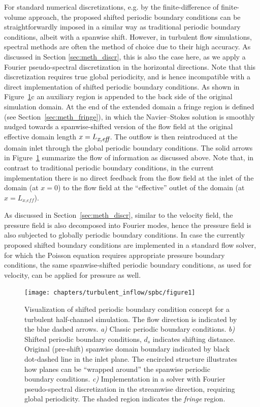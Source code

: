 	For standard numerical discretizations, e.g. by the finite-difference of finite-volume approach, the proposed shifted periodic boundary
	conditions can be straightforwardly imposed in a similar way as traditional periodic boundary conditions, albeit with a spanwise shift.
	However, in turbulent flow simulations,  spectral methods are often the method of choice due to their high accuracy. As discussed in Section
	\ref{sec:meth_discr}, this is also the case here, as we apply a Fourier pseudo-spectral discretization in the horizontal directions. Note that
	this discretization requires true global periodicity, and is hence incompatible with a direct implementation of shifted periodic boundary
	conditions. As shown in Figure~\ref{fig:concept}c an auxiliary region is appended to the back side of the original simulation domain. At the
	end of the extended domain a fringe region is defined (see Section~\ref{sec:meth_fringe}), in which the Navier--Stokes solution is smoothly
	nudged towards a spanwise-shifted version of the flow field at the original effective domain length $x = L_{\textit{\small x,eff}}$. The
	outflow is then reintroduced at the domain inlet through the global periodic boundary conditions. The solid arrows in Figure~\ref{fig:concept}
	summarize the flow of information as discussed above. Note that, in contrast to traditional periodic boundary conditions, in the current
	implementation there is no direct feedback from the flow field at the inlet of the domain (at $x=0$) to the flow field at the ``effective'' outlet of the domain (at $x=L_{\textit{x,eff}}$). 
	
	As discussed in Section~\ref{sec:meth_discr}, similar to the velocity field, the pressure field is also decomposed into Fourier modes, hence the pressure field is also subjected to globally periodic boundary conditions. In case the currently proposed shifted boundary conditions are implemented in a standard flow solver, for which the Poisson equation requires appropriate pressure boundary conditions, the same spanwise-shifted periodic boundary conditions, as used for velocity, can be applied for pressure as well.
	
	\begin{figure}
		\centering
		\texttt{[image: chapters/turbulent\_inflow/spbc/figure1]}
		\caption{Visualization of shifted periodic boundary condition concept for a turbulent half-channel simulation. The flow direction is indicated by the blue dashed arrows. \emph{a)} Classic periodic boundary conditions. \emph{b)} Shifted periodic boundary conditions, $d_s$ indicates shifting distance. Original (pre-shift) spanwise domain boundary indicated by black dot-dashed line in the inlet plane. The encircled structure illustrates how planes can be ``wrapped around'' the spanwise periodic boundary conditions. \emph{c)} Implementation in a solver with Fourier pseudo-spectral discretization in the streamwise direction, requiring global periodicity. The shaded region indicates the \emph{fringe} region.}
		\label{fig:concept}
	\end{figure}
	
